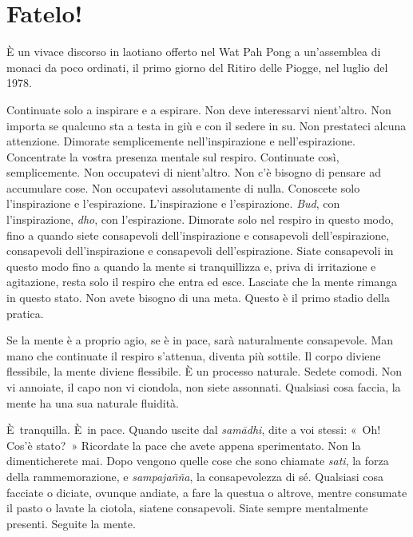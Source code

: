 \chapter{Fatelo!}

\begin{openingQuote}
  \centering

  È un vivace discorso in laotiano offerto nel Wat Pah Pong a un'assemblea di
  monaci da poco ordinati, il primo giorno del Ritiro delle Piogge, nel luglio
  del 1978.
\end{openingQuote}

Continuate solo a inspirare e a espirare. Non deve interessarvi
nient'altro. Non importa se qualcuno sta a testa in giù e con il sedere
in su. Non prestateci alcuna attenzione. Dimorate semplicemente
nell'inspirazione e nell'espirazione. Concentrate la vostra presenza
mentale sul respiro. Continuate così, semplicemente. Non occupatevi di
nient'altro. Non c'è bisogno di pensare ad accumulare cose. Non
occupatevi assolutamente di nulla. Conoscete solo l'inspirazione e
l'espirazione. L'inspirazione e l'espirazione. \emph{Bud}, con
l'inspirazione, \emph{dho}, con l'espirazione. Dimorate solo nel respiro
in questo modo, fino a quando siete consapevoli dell'inspirazione e
consapevoli dell'espirazione, consapevoli dell'inspirazione e
consapevoli dell'espirazione. Siate consapevoli in questo modo fino a
quando la mente si tranquillizza e, priva di irritazione e agitazione,
resta solo il respiro che entra ed esce. Lasciate che la mente rimanga
in questo stato. Non avete bisogno di una meta. Questo è il primo stadio
della pratica.

Se la mente è a proprio agio, se è in pace, sarà naturalmente
consapevole. Man mano che continuate il respiro s'attenua, diventa più
sottile. Il corpo diviene flessibile, la mente diviene flessibile. È un
processo naturale. Sedete comodi. Non vi annoiate, il capo non vi
ciondola, non siete assonnati. Qualsiasi cosa faccia, la mente ha una
sua naturale fluidità.

È~tranquilla. È~in pace. Quando uscite dal
\emph{samādhi}, dite a voi stessi: «~Oh! Cos'è stato?~» Ricordate la
pace che avete appena sperimentato. Non la dimenticherete mai. Dopo
vengono quelle cose che sono chiamate \emph{sati}, la forza della
rammemorazione, e \emph{sampajañña}, la consapevolezza di sé. Qualsiasi
cosa facciate o diciate, ovunque andiate, a fare la questua o altrove,
mentre consumate il pasto o lavate la ciotola, siatene consapevoli.
Siate sempre mentalmente presenti. Seguite la mente.

